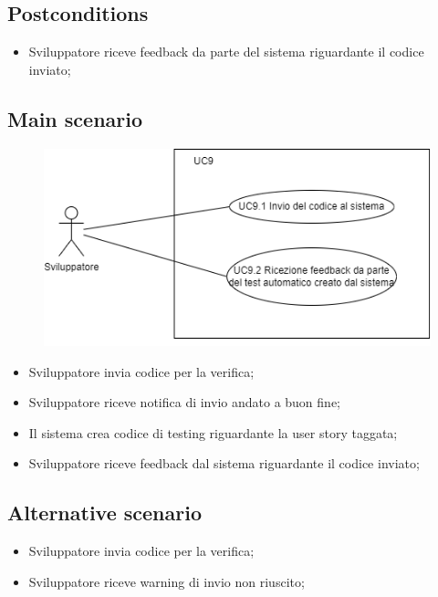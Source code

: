 \documentclass{article}
\begin{document}
    \subsection*{Postconditions}
        \begin{itemize}
            \item Sviluppatore riceve feedback da parte del sistema riguardante il codice inviato;
        \end{itemize}
    
    \subsection*{Main scenario}
        \begin{figure}[h]
          \centering
          \includegraphics{./imgUML/UC9-zoom.png}
          \label{fig:immagine}
        \end{figure}
        
        \begin{itemize}
            \item Sviluppatore invia codice per la verifica;
            \item Sviluppatore riceve notifica di invio andato a buon fine;
            \item Il sistema crea codice di testing riguardante la user story taggata;
            \item Sviluppatore riceve feedback dal sistema riguardante il codice inviato;
        \end{itemize}
        
    \subsection*{Alternative scenario}
        \begin{itemize}
            \item Sviluppatore invia codice per la verifica;
            \item Sviluppatore riceve warning di invio non riuscito;
        \end{itemize}
\end{document}
